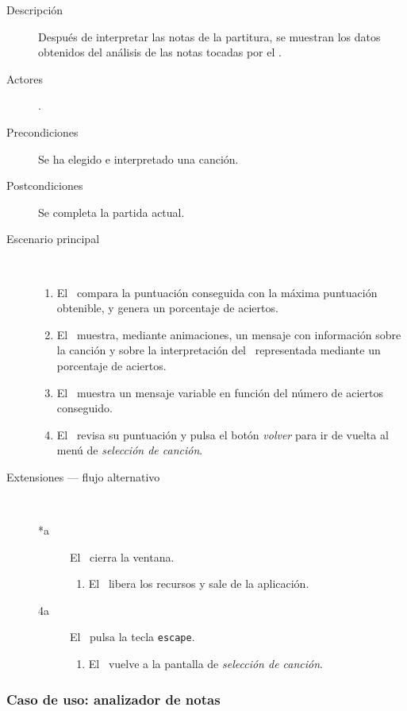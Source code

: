 \begin{description}
\item [Descripción] Después de interpretar las notas de la partitura, se
  muestran los datos obtenidos del análisis de las notas tocadas por el \jugador.
\item [Actores] \jugador.
\item [Precondiciones] Se ha elegido e interpretado una canción.
\item [Postcondiciones] Se completa la partida actual.
\item [Escenario principal] $\quad$
  \begin{enumerate}
  \item El \sistema\ compara la puntuación conseguida con la máxima puntuación
    obtenible, y genera un porcentaje de aciertos.
  \item El \sistema\ muestra, mediante animaciones, un mensaje con información
    sobre la canción y sobre la interpretación del \jugador\, representada
    mediante un porcentaje de aciertos.
  \item El \sistema\ muestra un mensaje variable en función del número de
    aciertos conseguido.
  \item El \jugador\ revisa su puntuación y pulsa el botón \textit{volver} para
    ir de vuelta al menú de \textit{selección de canción}.
  \end{enumerate}
\item[Extensiones --- flujo alternativo] $\quad$
  \begin{description}

  \item [*a] El \jugador\ cierra la ventana.
    \begin{enumerate}
    \item El \sistema\ libera los recursos y sale de la aplicación.
    \end{enumerate}

  \item[4a] El \jugador\ pulsa la tecla \texttt{escape}.
    \begin{enumerate}
    \item El \sistema\ vuelve a la pantalla de \textit{selección de canción}.
    \end{enumerate}

  \end{description}  
\end{description}


\subsubsection{Caso de uso: analizador de notas}

